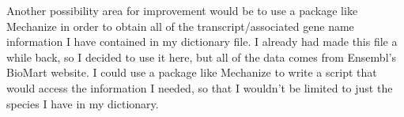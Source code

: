 \documentclass[12pt]{article}
\begin{document}
    Another possibility area for improvement would be to use a package like Mechanize in order to obtain all of the transcript/associated gene name information I have contained in my dictionary file. I already had made this file a while back, so I decided to use it here, but all of the data comes from Ensembl's BioMart website. I could use a package like Mechanize to write a script that would access the information I needed, so that I wouldn't be limited to just the species I have in my dictionary. 
    
    
    
\end{document}
